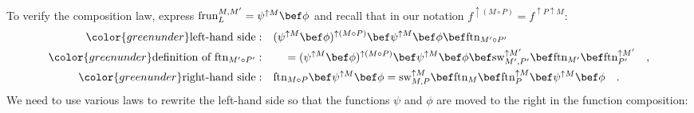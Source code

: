 To verify the composition law, express $\text{frun}_{L}^{M,M^{\prime}}=\psi^{\uparrow M}\bef\phi$
and recall that in our notation $f^{\uparrow(M\circ P)}=f^{\uparrow P\uparrow M}$:
\begin{align*}
{\color{greenunder}\text{left-hand side}:}\quad & (\psi^{\uparrow M}\bef\phi)^{\uparrow(M\circ P)}\bef\psi^{\uparrow M}\bef\phi\bef\text{ftn}_{M^{\prime}\circ P^{\prime}}\\
{\color{greenunder}\text{definition of }\text{ftn}_{M^{\prime}\circ P^{\prime}}:}\quad & \quad=(\psi^{\uparrow M}\bef\phi)^{\uparrow(M\circ P)}\bef\psi^{\uparrow M}\bef\phi\bef\text{sw}_{M^{\prime},P^{\prime}}^{\uparrow M^{\prime}}\bef\text{ftn}_{M^{\prime}}\bef\text{ftn}_{P^{\prime}}^{\uparrow M^{\prime}}\quad,\\
{\color{greenunder}\text{right-hand side}:}\quad & \text{ftn}_{M\circ P}\bef\psi^{\uparrow M}\bef\phi=\text{sw}_{M,P}^{\uparrow M}\bef\text{ftn}_{M}\bef\text{ftn}_{P}^{\uparrow M}\bef\psi^{\uparrow M}\bef\phi\quad.
\end{align*}
We need to use various laws to rewrite the left-hand side so that
the functions $\psi$ and $\phi$ are moved to the right in the function
composition:
